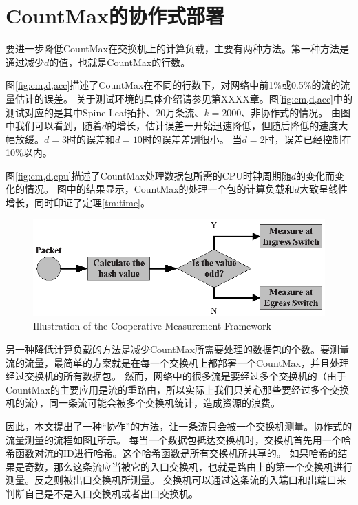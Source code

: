 \section{CountMax的协作式部署}\label{sec:coop}
要进一步降低CountMax在交换机上的计算负载，主要有两种方法。第一种方法是通过减少$d$的值，也就是CountMax的行数。

图\ref{fig:cm,d,acc}描述了CountMax在不同的行数下，对网络中前1\%或0.5\%的流的流量估计的误差。
关于测试环境的具体介绍请参见第XXXX章。图\ref{fig:cm,d,acc}中的测试对应的是其中Spine-Leaf拓扑、20万条流、$k=2000$、非协作式的情况。
由图中我们可以看到，随着$d$的增长，估计误差一开始迅速降低，但随后降低的速度大幅放缓。$d=3$时的误差和$d=10$时的误差差别很小。
当$d=2$时，误差已经控制在10\%以内。

图\ref{fig:cm,d,cpu}描述了CountMax处理数据包所需的CPU时钟周期随$d$的变化而变化的情况。
图中的结果显示，CountMax的处理一个包的计算负载和$d$大致呈线性增长，同时印证了定理\ref{tm:time}。


\begin{figure}[h]
   \centering
   \includegraphics[width=\linewidth]{fig/filter_measure.eps}
   \caption{Illustration of the Cooperative Measurement Framework}
   \label{fig:filtermeasurement}
\end{figure}

另一种降低计算负载的方法是减少CountMax所需要处理的数据包的个数。要测量流的流量，最简单的方案就是在每一个交换机上都部署一个CountMax，并且处理经过交换机的所有数据包。
然而，网络中的很多流是要经过多个交换机的（由于CountMax的主要应用是流的重路由，所以实际上我们只关心那些要经过多个交换机的流），同一条流可能会被多个交换机统计，造成资源的浪费。

因此，本文提出了一种“协作”的方法，让一条流只会被一个交换机测量。协作式的流量测量的流程如图\ref{fig:filtermeasurement}所示。
每当一个数据包抵达交换机时，交换机首先用一个哈希函数对流的ID进行哈希。这个哈希函数是所有交换机所共享的。
如果哈希的结果是奇数，那么这条流应当被它的入口交换机，也就是路由上的第一个交换机进行测量。反之则被出口交换机所测量。
交换机可以通过这条流的入端口和出端口来判断自己是不是入口交换机或者出口交换机。

